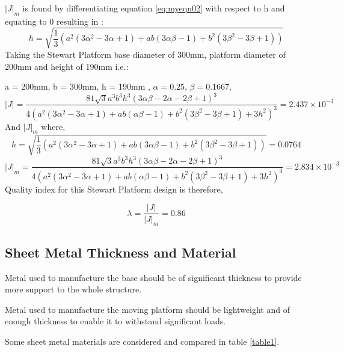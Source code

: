 $|J|_{m}$ is found by differentiating equation \eqref{eq:myeqn02} with respect to h and equating to 0 resulting in \cite{fernandes_design_nodate}:
\begin{equation}
h = \sqrt{\frac{1}{3}(a^2 (3 \alpha^2 - 3 \alpha + 1)+ ab (3\alpha\beta - 1)+b^2(3 \beta^2 - 3 \beta + 1))}
\label{eq:myeqn}
\end{equation}
Taking the Stewart Platform base diameter of 300mm, platform diameter of 200mm and height of 190mm i.e.: 

a = 200mm, b = 300mm, h = 190mm , $\alpha = 0.25$, $ \beta = 0.1667$,
\begin{equation*}
|J| =
\frac{81 \sqrt{3} a^3 b^3 h^3 (3 \alpha \beta - 2 \alpha - 2 \beta +1)^3}{4(a^2(3 \alpha^2 - 3 \alpha + 1)+ ab(\alpha \beta - 1 )+ b^2(3 \beta^2 - 3 \beta + 1)+ 3h^2)^3} = 2.437 \times 10^{-3}
\label{eq:myeqn}
\end{equation*}
And $ |J|_{m}$ where,
\begin{equation}
h = \sqrt{\frac{1}{3}(a^2 (3 \alpha^2 - 3 \alpha + 1)+ ab (3\alpha\beta - 1)+b^2(3 \beta^2 - 3 \beta + 1))} = 0.0764
\label{eq:myeqn}
\end{equation}
\begin{equation*}
|J|_{m} =
\frac{81 \sqrt{3} a^3 b^3 h^3 (3 \alpha \beta - 2 \alpha - 2 \beta +1)^3}{4(a^2(3 \alpha^2 - 3 \alpha + 1)+ ab(\alpha \beta - 1 )+ b^2(3 \beta^2 - 3 \beta + 1)+ 3h^2)^3} = 2.834 \times 10^{-3}
\label{eq:myeqn}
\end{equation*}
Quality index for this Stewart Platform design is therefore, 

$$\lambda = \frac{|J|}{|J|_{m}} = 0.86$$
\subsection{Sheet Metal Thickness and Material}
Metal used to manufacture the base should be of significant thickness to provide more support to the whole structure.

Metal used to manufacture the moving platform should be lightweight and of enough thickness to enable it to withstand significant loads.

Some sheet metal materials are considered and compared in table \ref{table1}.

